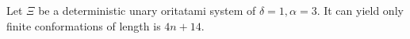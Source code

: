 

\begin{theorem}[$\delta = 1, \alpha = 3$]
Let $\Xi$ be a deterministic unary oritatami system of $\delta = 1, \alpha = 3$. It can yield only finite conformations of length is $4n + 14$.
\end{theorem}



